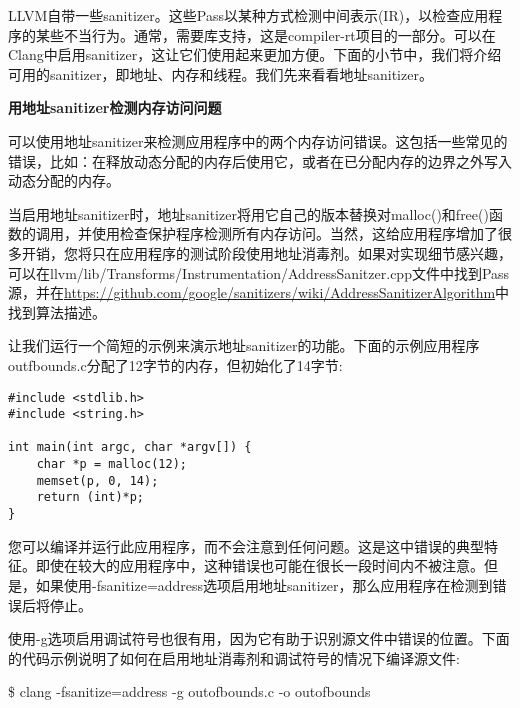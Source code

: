 
LLVM自带一些sanitizer。这些Pass以某种方式检测中间表示(IR)，以检查应用程序的某些不当行为。通常，需要库支持，这是compiler-rt项目的一部分。可以在Clang中启用sanitizer，这让它们使用起来更加方便。下面的小节中，我们将介绍可用的sanitizer，即地址、内存和线程。我们先来看看地址sanitizer。\par

\hspace*{\fill} \par %
\textbf{用地址sanitizer检测内存访问问题}

可以使用地址sanitizer来检测应用程序中的两个内存访问错误。这包括一些常见的错误，比如：在释放动态分配的内存后使用它，或者在已分配内存的边界之外写入动态分配的内存。\par

当启用地址sanitizer时，地址sanitizer将用它自己的版本替换对malloc()和free()函数的调用，并使用检查保护程序检测所有内存访问。当然，这给应用程序增加了很多开销，您将只在应用程序的测试阶段使用地址消毒剂。如果对实现细节感兴趣，可以在llvm/lib/Transforms/Instrumentation/AddressSanitzer.cpp文件中找到Pass源，并在\url{https://github.com/google/sanitizers/wiki/AddressSanitizerAlgorithm}中找到算法描述。\par

让我们运行一个简短的示例来演示地址sanitizer的功能。下面的示例应用程序outfbounds.c分配了12字节的内存，但初始化了14字节:\par

\begin{lstlisting}[caption={}]
#include <stdlib.h>
#include <string.h>

int main(int argc, char *argv[]) {
	char *p = malloc(12);
	memset(p, 0, 14);
	return (int)*p;
}
\end{lstlisting}

您可以编译并运行此应用程序，而不会注意到任何问题。这是这中错误的典型特征。即使在较大的应用程序中，这种错误也可能在很长一段时间内不被注意。但是，如果使用-fsanitize=address选项启用地址sanitizer，那么应用程序在检测到错误后将停止。\par

使用-g选项启用调试符号也很有用，因为它有助于识别源文件中错误的位置。下面的代码示例说明了如何在启用地址消毒剂和调试符号的情况下编译源文件:\par

\begin{tcolorbox}[colback=white,colframe=black]
\$ clang -fsanitize=address -g outofbounds.c -o outofbounds
\end{tcolorbox}

